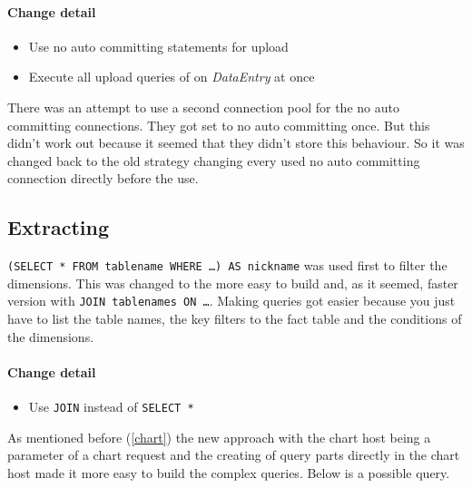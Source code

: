 \paragraph{Change detail} 
\begin{itemize}
  \item Use no auto committing statements for upload
  \item Execute all upload queries of on \textit{DataEntry} at once
\end{itemize}

There was an attempt to use a second connection pool for the no auto committing connections.
They got set to no auto committing once. But this didn't work out because it seemed
that they didn't store this behaviour. So it was changed back to the old strategy
changing every used no auto committing connection directly before the use.

\pagebreak[4]
\subsection{Extracting}
\texttt{(SELECT * FROM tablename WHERE \ldots) AS nickname} was used first to filter the dimensions.
This was changed to the more easy to build and, as it seemed, faster version with
\texttt{JOIN tablenames ON \ldots}. Making queries got easier because you just have to
list the table names, the key filters to the fact table and the conditions of the dimensions.

\paragraph{Change detail} 
\begin{itemize}
  \item Use \texttt{JOIN} instead of \texttt{SELECT *}
\end{itemize}

As mentioned before (\ref{chart}) the new approach with the chart host being a parameter
of a chart request and the creating of query parts directly in the chart host
made it more easy to build the complex queries. Below is a possible query.


